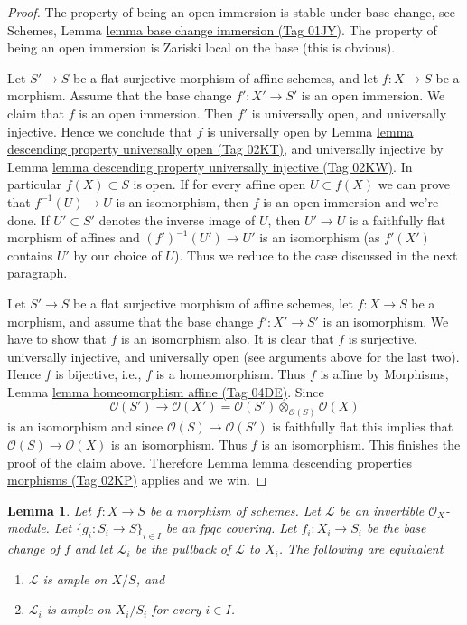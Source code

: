 \documentclass{amsart}
\theoremstyle{plain}
\newtheorem{lemma}[subsection]{Lemma}
\theoremstyle{definition}
\theoremstyle{remark}
\numberwithin{equation}{subsection}
\begin{document}
\begin{proof}
The property of being an open immersion is stable under base change,
see Schemes, Lemma \href{https://stacks.math.columbia.edu/tag/01JY}{lemma base change immersion (Tag 01JY)}.
The property of being an open immersion is Zariski local on the base
(this is obvious).

\medskip\noindent
Let $S' \to S$ be a flat surjective morphism of affine schemes,
and let $f : X \to S$ be a morphism. Assume that the base change
$f' : X' \to S'$ is an open immersion. We claim that $f$ is an
open immersion.
Then $f'$ is universally open, and universally injective.
Hence we conclude that $f$ is universally open by
Lemma \href{https://stacks.math.columbia.edu/tag/02KT}{lemma descending property universally open (Tag 02KT)}, and
universally injective by
Lemma \href{https://stacks.math.columbia.edu/tag/02KW}{lemma descending property universally injective (Tag 02KW)}.
In particular $f(X) \subset S$ is open. If for every affine
open $U \subset f(X)$ we can prove that $f^{-1}(U) \to U$
is an isomorphism, then $f$ is an open immersion and we're done.
If $U' \subset S'$ denotes the inverse image of $U$,
then $U' \to U$ is a faithfully flat morphism of affines and
$(f')^{-1}(U') \to U'$ is an isomorphism (as $f'(X')$ contains $U'$
by our choice of $U$). Thus we reduce to the case discussed
in the next paragraph.

\medskip\noindent
Let $S' \to S$ be a flat surjective morphism of affine schemes,
let $f : X \to S$ be a morphism, and assume that the base change
$f' : X' \to S'$ is an isomorphism. We have to show that $f$ is an
isomorphism also. It is clear that $f$ is surjective, universally injective,
and universally open (see arguments above for the last two).
Hence $f$ is bijective, i.e., $f$ is a homeomorphism.
Thus $f$ is affine by
Morphisms, Lemma \href{https://stacks.math.columbia.edu/tag/04DE}{lemma homeomorphism affine (Tag 04DE)}.
Since
$$
\mathcal{O}(S') \to
\mathcal{O}(X') =
\mathcal{O}(S') \otimes_{\mathcal{O}(S)} \mathcal{O}(X)
$$
is an isomorphism and since $\mathcal{O}(S) \to \mathcal{O}(S')$
is faithfully flat this implies that $\mathcal{O}(S) \to \mathcal{O}(X)$
is an isomorphism. Thus $f$ is an isomorphism. This finishes the proof of
the claim above.
Therefore Lemma \href{https://stacks.math.columbia.edu/tag/02KP}{lemma descending properties morphisms (Tag 02KP)} applies and we win.
\end{proof}


\begin{lemma}
\label{lemma-descending-property-ample}
Let $f : X \to S$ be a morphism of schemes.
Let $\mathcal{L}$ be an invertible $\mathcal{O}_X$-module.
Let $\{g_i : S_i \to S\}_{i \in I}$ be an fpqc covering.
Let $f_i : X_i \to S_i$ be the base change of $f$ and let $\mathcal{L}_i$
be the pullback of $\mathcal{L}$ to $X_i$.
The following are equivalent
\begin{enumerate}
\item $\mathcal{L}$ is ample on $X/S$, and
\item $\mathcal{L}_i$ is ample on $X_i/S_i$
for every $i \in I$.
\end{enumerate}
\end{lemma}
\end{document}
